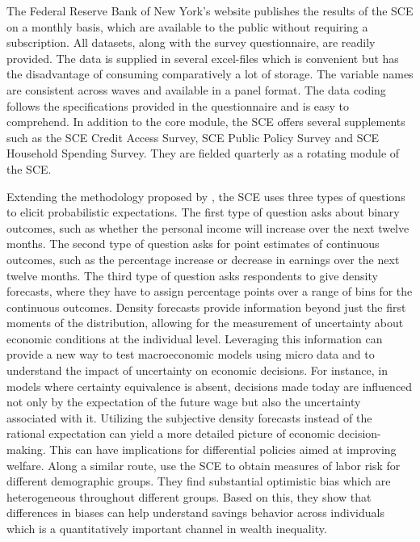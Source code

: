 \documentclass[11pt,a4paper,leqno]{article}
\begin{document}
The Federal Reserve Bank of New York's website publishes the results of the SCE on a monthly basis, which are available to the public without requiring a subscription.  All datasets, along with the survey questionnaire, are readily provided. The data is supplied in several excel-files which is convenient but has the disadvantage of consuming comparatively a lot of storage. The variable names are consistent across waves and available in a panel format. The data coding follows the specifications provided in the questionnaire and is easy to comprehend. In addition to the core module, the SCE offers several supplements such as the SCE Credit Access Survey, SCE Public Policy Survey and SCE Household Spending Survey. They are fielded quarterly as a rotating module of the SCE. 

Extending the methodology proposed by \textcite{Manski}, the SCE uses three types of questions to elicit probabilistic expectations. The first type of question asks about binary outcomes, such as whether the personal income will increase over the next twelve months. The second type of question asks for point estimates of continuous outcomes, such as the percentage increase or decrease in earnings over the next twelve months. The third type of question asks respondents to give density forecasts, where they have to assign percentage points over a range of bins for the continuous outcomes. Density forecasts provide information beyond just the first moments of the distribution, allowing for the measurement of uncertainty about economic conditions at the individual level. Leveraging this information can provide a new way to test macroeconomic models using micro data and to understand the impact of uncertainty on economic decisions. 
For instance, in models where certainty equivalence is absent, decisions made today are influenced not only by the expectation of the future wage but also the uncertainty associated with it. Utilizing the subjective density forecasts instead of the rational expectation can yield a more detailed picture of economic decision-making. This can have implications for differential policies aimed at improving welfare. 
Along a similar route, \textcite{Baleer2021} use the SCE to obtain measures of labor risk for different demographic groups. They find substantial optimistic bias which are heterogeneous throughout different groups. Based on this, they show that differences in biases can help understand savings behavior across individuals which is a quantitatively important channel in wealth inequality. 
\end{document}
